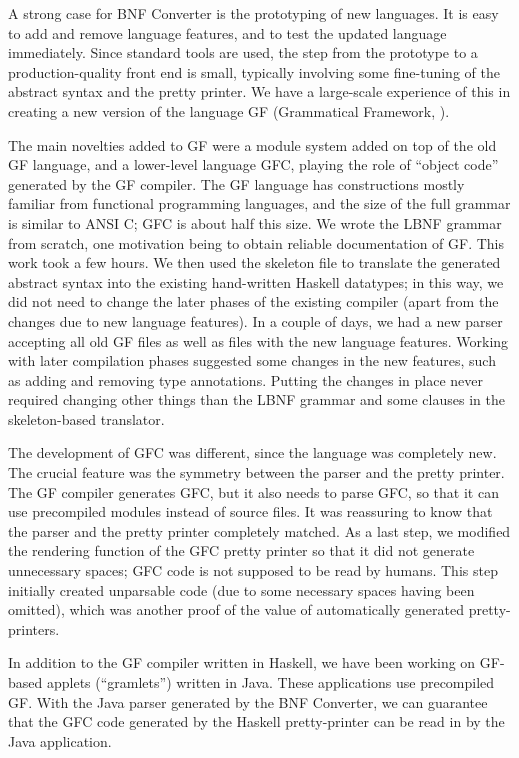 
A strong case for BNF Converter is the prototyping of new
languages. It is easy to add and remove language
features, and to test the updated language immediately.
Since standard tools are used, the step from the
prototype to a production-quality front end is small,
typically involving some fine-tuning of the abstract
syntax and the pretty printer. We have a large-scale
experience of this in creating a new version of the
language GF (Grammatical Framework, \cite{GF-paper}).

The main novelties added to GF were
a module system added on top of the old GF language,
and a lower-level language GFC, playing the role of
``object code'' generated by the GF compiler.
The GF language has constructions mostly familiar from functional
programming languages,
and the size of the full grammar is similar
to ANSI C; GFC is about half this size.
We wrote the LBNF grammar from scratch, one motivation
being to obtain reliable documentation of GF.
This work took a few hours. We then used the skeleton file
to translate the generated abstract syntax into the existing
hand-written Haskell datatypes; in this way, we did not
need to change the later phases of the existing compiler (apart from
the changes due to new language features). In a couple of days,
we had a new parser accepting all old GF files as well as
files with the new language features. Working with later compilation
phases suggested some changes in the new features, such as adding
and removing type annotations. Putting the changes in place never required
changing other things than the LBNF grammar and some clauses in
the skeleton-based translator.

The development of GFC was different, since the language
was completely new. The crucial feature was the symmetry between
the parser and the pretty printer. The GF compiler generates
GFC, but it also needs to parse GFC, so that it can use precompiled
modules instead of source files. It was reassuring to know
that the parser and the pretty printer completely matched.
As a last step, we modified the rendering function of the GFC
pretty printer so that it did not generate unnecessary spaces;
GFC code is not supposed to be read by humans. This step initially
created unparsable code (due to some necessary spaces having been
omitted), which was another proof of the value of automatically
generated pretty-printers.

In addition to the GF compiler written in Haskell, we have been
working on GF-based applets (``gramlets'') written in Java.
These applications use precompiled GF. With the Java parser
generated by the BNF Converter, we can guarantee that the GFC code generated
by the Haskell pretty-printer can be read in by the Java application.
